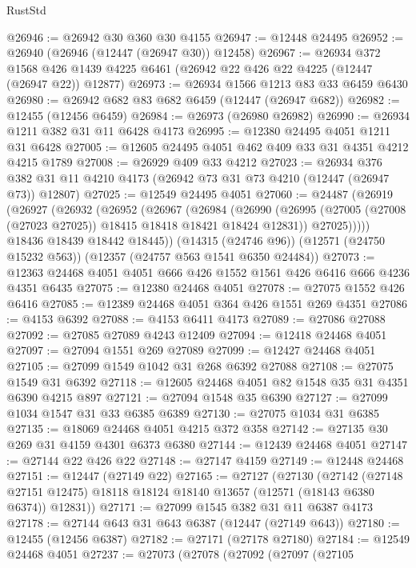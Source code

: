 \begin{lexlean}{RustStd}
\begin{coremodule}
@26946 := @26942 @30 @360 @30 @4155
@26947 := @12448 @24495
@26952 := @26940 (@26946 (@12447 (@26947 @30)) @12458)
@26967 := @26934
    @372
    @1568
    @426
    @1439
    @4225
    @6461
    (@26942 @22 @426 @22 @4225 (@12447 (@26947 @22)) @12877)
@26973 := @26934 @1566 @1213 @83 @33 @6459 @6430
@26980 := @26942 @682 @83 @682 @6459 (@12447 (@26947 @682))
@26982 := @12455 (@12456 @6459)
@26984 := @26973 (@26980 @26982)
@26990 := @26934 @1211 @382 @31 @11 @6428 @4173
@26995 := @12380 @24495 @4051 @1211 @31 @6428
@27005 := @12605 @24495 @4051 @462 @409 @33 @31 @4351 @4212 @4215 @1789
@27008 := @26929 @409 @33 @4212
@27023 := @26934
    @376
    @382
    @31
    @11
    @4210
    @4173
    (@26942 @73 @31 @73 @4210 (@12447 (@26947 @73)) @12807)
@27025 := @12549 @24495 @4051
@27060 := @24487
    (@26919
      (@26927
        (@26932
          (@26952
            (@26967
              (@26984
                (@26990
                  (@26995 (@27005 (@27008 (@27023 @27025)) @18415 @18418 @18421 @18424 @12831))
                  @27025)))))
        @18436
        @18439
        @18442
        @18445))
    (@14315 (@24746 @96))
    (@12571 (@24750 @15232 @563))
    (@12357 (@24757 @563 @1541 @6350 @24484))
@27073 := @12363 @24468 @4051 @4051 @666 @426 @1552 @1561 @426 @6416 @666 @4236 @4351 @6435
@27075 := @12380 @24468 @4051
@27078 := @27075 @1552 @426 @6416
@27085 := @12389 @24468 @4051 @364 @426 @1551 @269 @4351
@27086 := @4153 @6392
@27088 := @4153 @6411 @4173
@27089 := @27086 @27088
@27092 := @27085 @27089 @4243 @12409
@27094 := @12418 @24468 @4051
@27097 := @27094 @1551 @269 @27089
@27099 := @12427 @24468 @4051
@27105 := @27099 @1549 @1042 @31 @268 @6392 @27088
@27108 := @27075 @1549 @31 @6392
@27118 := @12605 @24468 @4051 @82 @1548 @35 @31 @4351 @6390 @4215 @897
@27121 := @27094 @1548 @35 @6390
@27127 := @27099 @1034 @1547 @31 @33 @6385 @6389
@27130 := @27075 @1034 @31 @6385
@27135 := @18069 @24468 @4051 @4215 @372 @358
@27142 := @27135 @30 @269 @31 @4159 @4301 @6373 @6380
@27144 := @12439 @24468 @4051
@27147 := @27144 @22 @426 @22
@27148 := @27147 @4159
@27149 := @12448 @24468
@27151 := @12447 (@27149 @22)
@27165 := @27127
    (@27130
      (@27142
        (@27148 @27151 @12475)
        @18118
        @18124
        @18140
        @13657
        (@12571 (@18143 @6380 @6374))
        @12831))
@27171 := @27099 @1545 @382 @31 @11 @6387 @4173
@27178 := @27144 @643 @31 @643 @6387 (@12447 (@27149 @643))
@27180 := @12455 (@12456 @6387)
@27182 := @27171 (@27178 @27180)
@27184 := @12549 @24468 @4051
@27237 := @27073
    (@27078
      (@27092
        (@27097
          (@27105

\end{coremodule}
\end{lexlean}
